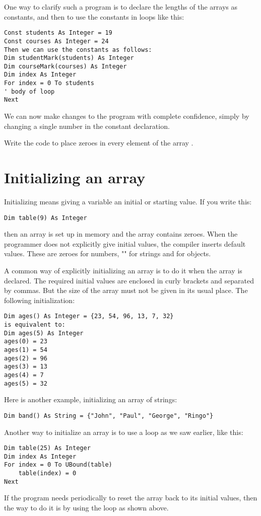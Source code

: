 		One way to clarify such a program is to declare the lengths of the arrays as constants, and then to use the constants in  loops like this:
		\begin{lstlisting}
Const students As Integer = 19
Const courses As Integer = 24
Then we can use the constants as follows:
Dim studentMark(students) As Integer
Dim courseMark(courses) As Integer
Dim index As Integer
For index = 0 To students
' body of loop
Next
		\end{lstlisting}
		We can now make changes to the program with complete confidence, simply by changing a single number in the constant declaration.

		\begin{stqb}
			\begin{STQ}
				\item Write the code to place zeroes in every element of the array .
			\end{STQ}
		\end{stqb}


	\section{Initializing an array}
		Initializing means giving a variable an initial or starting value. If you write this:
		\begin{lstlisting}
Dim table(9) As Integer
		\end{lstlisting}
		then an array is set up in memory and the array contains zeroes. When the programmer does not explicitly give initial values, the compiler inserts default values. These are zeroes for numbers, "" for strings and  for objects.

		A common way of explicitly initializing an array is to do it when the array is declared. The required initial values are enclosed in curly brackets and separated by commas. But the size of the array must not be given in its usual place. The following initialization:
		\begin{lstlisting}
Dim ages() As Integer = {23, 54, 96, 13, 7, 32}
is equivalent to:
Dim ages(5) As Integer
ages(0) = 23
ages(1) = 54
ages(2) = 96
ages(3) = 13
ages(4) = 7
ages(5) = 32
		\end{lstlisting}
		Here is another example, initializing an array of strings:
		\begin{lstlisting}
Dim band() As String = {"John", "Paul", "George", "Ringo"}
		\end{lstlisting}
		Another way to initialize an array is to use a loop as we saw earlier, like this:
		\begin{lstlisting}
Dim table(25) As Integer
Dim index As Integer
For index = 0 To UBound(table)
    table(index) = 0
Next
		\end{lstlisting}
		If the program needs periodically to reset the array back to its initial values, then the way to do it is by using the  loop as shown above.

